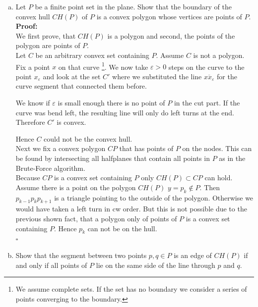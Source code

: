 \documentclass[11pt,a4paper,ngerman]{article}
\begin{document}
\begin{description}
\begin{enumerate}[a)]
    \item Let $P$ be a finite point set in the plane.
          Show that the boundary of the convex hull $CH(P)$ of $P$ is a convex polygon
          whose vertices are points of $P$. \\

     \textbf{Proof:}\\
     We first prove, that $CH(P)$ is a polygon and second, the 
     points of the polygon are points of $P$.\\

     Let $C$ be an arbitrary convex set containing $P$. Assume $C$ is
    not a polygon. Fix a point $x$ on that curve 
    \footnote{We assume complete sets. If the set has no boundary
    we consider a series of points converging to the boundary.}.
    We now take $\varepsilon > 0$ steps on the curve to the point
    $x_\varepsilon$ and look at the 
    set $C'$ where we substituted the line $\overline{xx_\varepsilon}$
    for the curve segment that connected them before.

    We know if $\varepsilon$ is small enough there is no point of $P$
    in the cut part. If the curve was bend left, the resulting line will
    only do left turns at the end. Therefore $C'$ is convex.

    Hence $C$ could not be the convex hull.\\

    Next we fix a convex polygon $CP$ that has points of $P$ on the
    nodes. This can be found by intersecting all halfplanes that contain all
    points in $P$ as in the Brute-Force algorithm.\\

    Because $CP$ is a convex set containing $P$ only 
    $CH(P) \subset CP$ can hold.\\

    Assume there is a point on the polygon $CH(P)$ $y=p_k \not \in P$.
    Then $p_{k-1}p_kp_{k+1}$ is a triangle pointing to the outside
    of the polygon. Otherwise we would have taken a left turn in cw
    order.
    But this is not possible due to the previous shown fact, that
    a polygon only of points of $P$ is a convex set containing $P$.
    Hence $p_k$ can not be on the hull.\\
\mbox{}\hfill$\square$

    \item Show that the segment between two points $p, q \in P$ is an edge of $CH(P)$ if
          and only if all points of $P$ lie on the same side of the line through $p$ and $q$. \\


\end{enumerate}
\end{description}
\end{document}
